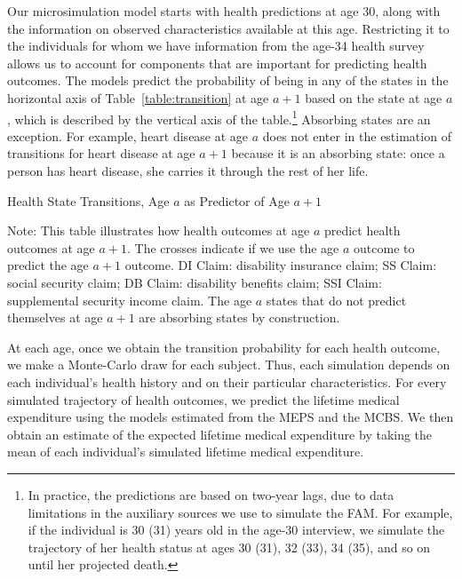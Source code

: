 Our microsimulation model starts with health predictions at age 30, along with the information on observed characteristics available at this age. Restricting it to the individuals for whom we have information from the age-34 health survey allows us to account for components that are important for predicting health outcomes. The models predict the probability of being in any of the states in the horizontal axis of Table~\ref{table:transition} at age $a+1$ based on the state at age $a$, which is described by the vertical axis of the table.\footnote{In practice, the predictions are based on two-year lags, due to data limitations in the auxiliary sources we use to simulate the FAM. For example, if the individual is 30 (31) years old in the age-30 interview, we simulate the trajectory of her health status at ages 30 (31), 32 (33), 34 (35), and so on until her projected death.} Absorbing states are an exception. For example, heart disease at age $a$ does not enter in the estimation of transitions for heart disease at age $a+1$ because it is an absorbing state: once a person has heart disease, she carries it through the rest of her life.

\begin{table}
\begin{threeparttable}
\caption{Health State Transitions, Age $a$ as Predictor of Age $a+1$}\label{table:transition}
\scriptsize

\begin{tablenotes}
\footnotesize
\item Note: This table illustrates how health outcomes at age $a$ predict health outcomes at age $a+1$. The crosses indicate if we use the age $a$ outcome to predict the age $a+1$ outcome. DI Claim: disability insurance claim; SS Claim: social security claim; DB Claim: disability benefits claim; SSI Claim: supplemental security income claim. The age $a$ states that do not predict themselves at age $a+1$ are absorbing states by construction.
\end{tablenotes}
\end{threeparttable}
\end{table}

At each age, once we obtain the transition probability for each health outcome, we make a Monte-Carlo draw for each subject. Thus, each simulation depends on each individual's health history and on their particular characteristics. For every simulated trajectory of health outcomes, we predict the lifetime medical expenditure using the models estimated from the MEPS and the MCBS. We then obtain an estimate of the expected lifetime medical expenditure by taking the mean of each individual's simulated lifetime medical expenditure.

